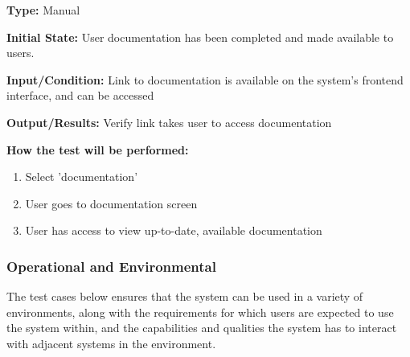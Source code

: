 \documentclass[12pt, titlepage]{article}
\begin{document}
\begin{itemize}
  \begin{mdframed}[linewidth=0.5mm]
      \textbf{Type:} Manual \par
      \textbf{Initial State:} User documentation has been completed and made available to users. \par
      \textbf{Input/Condition:} Link to documentation is available on the system's frontend interface, and can be accessed\par
      \textbf{Output/Results:} Verify link takes user to access documentation \par
      \textbf{How the test will be performed:}
      \begin{enumerate}[noitemsep]
        \item Select 'documentation'
        \item User goes to documentation screen
        \item User has access to view up-to-date, available documentation
      \end{enumerate}
  \end{mdframed}
\end{itemize}



\subsubsection{Operational and Environmental}
\hspace{2em}The test cases below ensures that the system can be used in a variety of environments,
along with the requirements for which users are expected to use the system within, and the capabilities
and qualities the system has to interact with adjacent systems in the environment.
\end{document}
